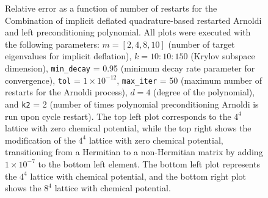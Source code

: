 \begin{figure}[H]
    \caption{\small Relative error as a function of number of restarts for the Combination of implicit deflated quadrature-based restarted Arnoldi and left preconditioning polynomial. All plots were executed with the following parameters: $m = [2, 4, 8, 10]$ (number of target eigenvalues for implicit deflation), $k = 10:10:150$ (Krylov subspace dimension), \texttt{min\_decay} = 0.95 (minimum decay rate parameter for convergence), \texttt{tol} = $1 \times 10^{-12}$, \texttt{max\_iter} = 50 (maximum number of restarts for the Arnoldi process), $d = 4$ (degree of the polynomial), and \texttt{k2} = 2 (number of times polynomial preconditioning Arnoldi is run upon cycle restart). The top left plot corresponds to the $4^4$ lattice with zero chemical potential, while the top right shows the modification of the $4^4$ lattice with zero chemical potential, transitioning from a Hermitian to a non-Hermitian matrix by adding $1 \times 10^{-7}$ to the bottom left element. The bottom left plot represents the $4^4$ lattice with chemical potential, and the bottom right plot shows the $8^4$ lattice with chemical potential.}
    \label{fig:combo_imp_rest_arnoldi+left_precond_rest_plot}
\end{figure}

